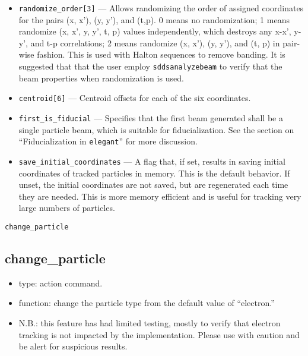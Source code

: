 \documentclass[11pt]{article}
\begin{document}
\begin{itemize}
\item \verb|randomize_order[3]| --- Allows randomizing the order of
assigned coordinates for the pairs (x, x'), (y, y'), and (t,p).  0
means no randomization; 1 means randomize (x, x', y, y', t, p) values
independently, which destroys any x-x', y-y', and t-p correlations; 2
means randomize (x, x'), (y, y'), and (t, p) in pair-wise fashion.
This is used with Halton sequences to remove banding.  It is suggested
that that the user employ \verb|sddsanalyzebeam| to verify that the
beam properties when randomization is used.

\item \verb|centroid[6]| --- Centroid offsets for each of the six coordinates.

\item \verb|first_is_fiducial| --- Specifies that the first beam
generated shall be a single particle beam, which is suitable for
fiducialization.  See the section on ``Fiducialization in
\verb|elegant|'' for more discussion.

\item \verb|save_initial_coordinates| --- A flag that, if set, results
in saving initial coordinates of tracked particles in memory.  This is
the default behavior.  If unset, the initial coordinates are not
saved, but are regenerated each time they are needed.  This is more
memory efficient and is useful for tracking very large numbers of
particles.
\end{itemize}

\begin{latexonly}
\newpage
\begin{center}{\Large\verb|change_particle|}\end{center}
\end{latexonly}
\subsection{change\_particle\label{subsec:changeparticle}}

\begin{itemize}
\item type: action command.
\item function: change the particle type from the default value of ``electron.''
\item N.B.: this feature has had limited testing, mostly to verify that electron tracking is not
 impacted by the implementation.  Please use with caution and be alert for suspicious results.
\end{itemize}
\end{document}
